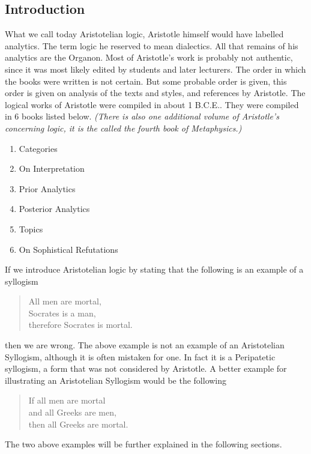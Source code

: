 \documentclass[12pt]{article}
\begin{document}
\subsection*{Introduction}
What we call today Aristotelian logic, Aristotle himself would have labelled analytics.  The term logic he reserved to mean dialectics.  All that remains of his analytics are the Organon.\cite{IEP}  %
Most of Aristotle's work is probably not authentic, since it was most likely edited by students and later lecturers.\cite{BI}  The order in which the books were written is not certain.  But some probable order is given, this order is given on analysis of the texts and styles, and references by Aristotle.\cite{BI}  The logical works of Aristotle were compiled in about 1 B.C.E..  They were compiled in 6 books listed below.  \textit{(There is also one additional volume of Aristotle's concerning logic, it is the called the fourth book of Metaphysics.)}\cite{BI}
\begin{center}
\begin{enumerate}
\item Categories
\item On Interpretation
\item Prior Analytics
\item Posterior Analytics
\item Topics
\item On Sophistical Refutations
\end{enumerate}
\end{center} 
If we introduce Aristotelian logic by stating that the following is an example of a syllogism
\begin{quote}
\begin{center}
All men are mortal,\\
Socrates is a man,\\
therefore Socrates is mortal.
\end{center}
\end{quote}
then we are wrong.\cite{LJ}  The above example is not an example of an Aristotelian Syllogism,  although it is often mistaken for one.  In fact it is a Peripatetic syllogism, a form that was not considered by Aristotle.  A better example for illustrating an Aristotelian Syllogism would be the following 
\begin{quote}
\begin{center}
If all men are mortal\\
and all Greeks are men,\\
then all Greeks are mortal.\cite{LJ}
\end{center}
\end{quote}
The two above examples will be further explained in the following sections.\
\end{document}
